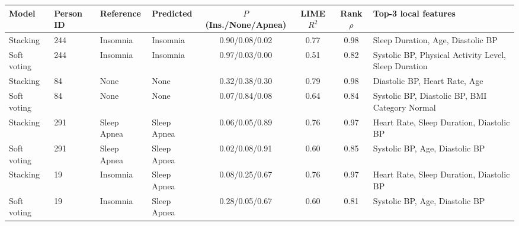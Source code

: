 \begin{tabular}{@{}llllcccl@{}}
\toprule
Model & Person ID & Reference & Predicted & $P$(Ins./None/Apnea) & LIME $R^2$ & Rank $\rho$ & Top-3 local features\\
\midrule
Stacking & 244 & Insomnia & Insomnia & 0.90/0.08/0.02 & 0.77 & 0.98 & Sleep Duration, Age, Diastolic BP\\
Soft voting & 244 & Insomnia & Insomnia & 0.97/0.03/0.00 & 0.51 & 0.82 & Systolic BP, Physical Activity Level, Sleep Duration\\\midrule
Stacking & 84 & None & None & 0.32/0.38/0.30 & 0.79 & 0.98 & Diastolic BP, Heart Rate, Age\\
Soft voting & 84 & None & None & 0.07/0.84/0.08 & 0.64 & 0.84 & Systolic BP, Diastolic BP, BMI Category Normal\\\midrule
Stacking & 291 & Sleep Apnea & Sleep Apnea & 0.06/0.05/0.89 & 0.76 & 0.97 & Heart Rate, Sleep Duration, Diastolic BP\\
Soft voting & 291 & Sleep Apnea & Sleep Apnea & 0.02/0.08/0.91 & 0.60 & 0.85 & Systolic BP, Age, Diastolic BP\\\midrule
Stacking & 19 & Insomnia & Sleep Apnea & 0.08/0.25/0.67 & 0.76 & 0.97 & Heart Rate, Sleep Duration, Diastolic BP\\
Soft voting & 19 & Insomnia & Sleep Apnea & 0.28/0.05/0.67 & 0.60 & 0.81 & Systolic BP, Age, Diastolic BP\\
\bottomrule
\end{tabular}